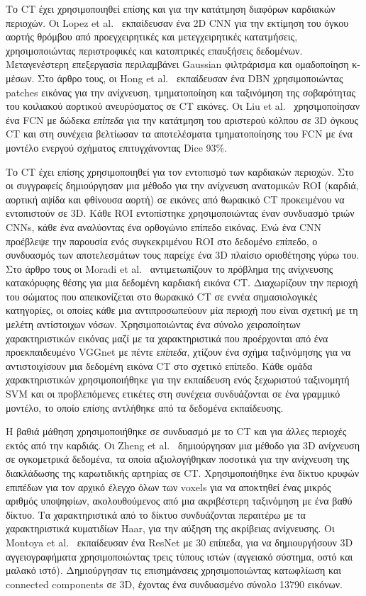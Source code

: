 Το CT έχει χρησιμοποιηθεί επίσης και για την κατάτμηση διαφόρων καρδιακών περιοχών.
Οι Lopez et al.~\cite{lopez2017dcnn} εκπαίδευσαν ένα 2D CNN για την εκτίμηση του όγκου αορτής θρόμβου από προεγχειρητικές και μετεγχειρητικές κατατμήσεις, χρησιμοποιώντας περιστροφικές και κατοπτρικές επαυξήσεις δεδομένων.
Μεταγενέστερη επεξεργασία περιλαμβάνει Gaussian φιλτράρισμα και ομαδοποίηση κ-μέσων.
Στο άρθρο τους, οι Hong et al.~\cite{hong2016automatic} εκπαίδευσαν ένα DBN χρησιμοποιώντας patches εικόνας για την ανίχνευση, τμηματοποίηση και ταξινόμηση της σοβαρότητας του κοιλιακού αορτικού ανευρύσματος σε CT εικόνες.
Οι Liu et al.~\cite{liu2017left} χρησιμοποίησαν ένα FCN με δώδεκα \textit{επίπεδα} για την κατάτμηση του αριστερού κόλπου σε 3D όγκους CT και στη συνέχεια βελτίωσαν τα αποτελέσματα τμηματοποίησης του FCN με ένα μοντέλο ενεργού σχήματος επιτυγχάνοντας Dice 93\%.

Το CT έχει επίσης χρησιμοποιηθεί για τον εντοπισμό των καρδιακών περιοχών.
Στο~\cite{de20162d} οι συγγραφείς δημιούργησαν μια μέθοδο για την ανίχνευση ανατομικών ROI (καρδιά, αορτική αψίδα και φθίνουσα αορτή) σε εικόνες από θωρακικό CT προκειμένου να εντοπιστούν σε 3D.
Κάθε ROI εντοπίστηκε χρησιμοποιώντας έναν συνδυασμό τριών CNNs, κάθε ένα αναλύοντας ένα ορθογώνιο επίπεδο εικόνας.
Ενώ ένα CNN προέβλεψε την παρουσία ενός συγκεκριμένου ROI στο δεδομένο επίπεδο, ο συνδυασμός των αποτελεσμάτων τους παρείχε ένα 3D πλαίσιο οριοθέτησης γύρω του.
Στο άρθρο τους οι Moradi et al.~\cite{moradi2016hybrid} αντιμετωπίζουν το πρόβλημα της ανίχνευσης κατακόρυφης θέσης για μια δεδομένη καρδιακή εικόνα CT\@.
Διαχωρίζουν την περιοχή του σώματος που απεικονίζεται στο θωρακικό CT σε εννέα σημασιολογικές κατηγορίες, οι οποίες κάθε μια αντιπροσωπεύουν μία περιοχή που είναι σχετική με τη μελέτη αντίστοιχων νόσων.
Χρησιμοποιώντας ένα σύνολο χειροποίητων χαρακτηριστικών εικόνας μαζί με τα χαρακτηριστικά που προέρχονται από ένα προεκπαιδευμένο VGGnet με πέντε \textit{επίπεδα}, χτίζουν ένα σχήμα ταξινόμησης για να αντιστοιχίσουν μια δεδομένη εικόνα CT στο σχετικό επίπεδο.
Κάθε ομάδα χαρακτηριστικών χρησιμοποιήθηκε για την εκπαίδευση ενός ξεχωριστού ταξινομητή SVM και οι προβλεπόμενες ετικέτες στη συνέχεια συνδυάζονται σε ένα γραμμικό μοντέλο, το οποίο επίσης αντλήθηκε από τα δεδομένα εκπαίδευσης.

Η βαθιά μάθηση χρησιμοποιήθηκε σε συνδυασμό με το CT και για άλλες περιοχές εκτός από την καρδιάς.
Οι Zheng et al.~\cite{zheng20153d} δημιούργησαν μια μέθοδο για 3D ανίχνευση σε ογκομετρικά δεδομένα, τα οποία αξιολογήθηκαν ποσοτικά για την ανίχνευση της διακλάδωσης της καρωτιδικής αρτηρίας σε CT\@.
Χρησιμοποιήθηκε ένα δίκτυο κρυφών επιπέδων για τον αρχικό έλεγχο όλων των voxels για να αποκτηθεί ένας μικρός αριθμός υποψηφίων, ακολουθούμενος από μια ακριβέστερη ταξινόμηση με ένα βαθύ δίκτυο.
Τα χαρακτηριστικά από το δίκτυο συνδυάζονται περαιτέρω με τα χαρακτηριστικά κυματιδίων Haar, για την αύξηση της ακρίβειας ανίχνευσης.
Οι Montoya et al.~\cite{montoya2018deep} εκπαίδευσαν ένα ResNet με 30 επίπεδα, για να δημιουργήσουν 3D αγγειογραφήματα χρησιμοποιώντας τρεις τύπους ιστών (αγγειακό σύστημα, οστό και μαλακό ιστό).
Δημιούργησαν τις επισημάνσεις χρησιμοποιώντας κατωφλίωση και connected components σε 3D, έχοντας ένα συνδυασμένο σύνολο 13790 εικόνων.

